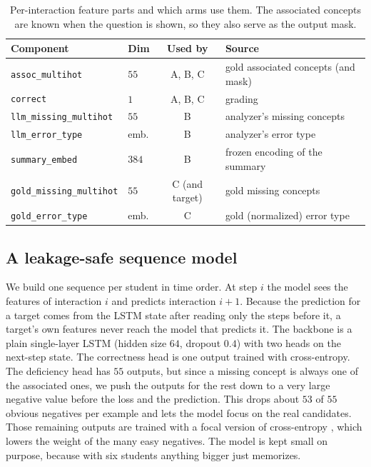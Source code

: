 \documentclass[11pt]{article}
\newcommand{\code}[1]{\texttt{\small #1}}
\begin{document}
\begin{table}[t]
\centering
\caption{Per-interaction feature parts and which arms use them. The associated
concepts are known when the question is shown, so they also serve as the output mask.}
\label{tab:features}
\small
\begin{tabular}{@{}llcl@{}}
\toprule
\textbf{Component} & \textbf{Dim} & \textbf{Used by} & \textbf{Source}\\
\midrule
\code{assoc\_multihot}        & $55$  & A, B, C & gold associated concepts (and mask)\\
\code{correct}                & $1$   & A, B, C & grading\\
\code{llm\_missing\_multihot} & $55$  & B       & analyzer's missing concepts\\
\code{llm\_error\_type}       & emb.  & B       & analyzer's error type\\
\code{summary\_embed}         & $384$ & B       & frozen encoding of the summary\\
\code{gold\_missing\_multihot}& $55$  & C (and target) & gold missing concepts\\
\code{gold\_error\_type}      & emb.  & C       & gold (normalized) error type\\
\bottomrule
\end{tabular}
\end{table}

\subsection{A leakage-safe sequence model}
We build one sequence per student in time order. At step $i$ the model sees the
features of interaction $i$ and predicts interaction $i\!+\!1$. Because the prediction
for a target comes from the LSTM state after reading only the steps before it, a
target's own features never reach the model that predicts it. The backbone is a plain
single-layer LSTM (hidden size $64$, dropout $0.4$) with two heads on the next-step
state. The correctness head is one output trained with cross-entropy. The deficiency
head has $55$ outputs, but since a missing concept is always one of the associated
ones, we push the outputs for the rest down to a very large negative value before the
loss and the prediction. This drops about $53$ of $55$ obvious negatives per example
and lets the model focus on the real candidates. Those remaining outputs are trained
with a focal version of cross-entropy \cite{lin2017focal}, which lowers the weight of
the many easy negatives. The model is kept small on purpose, because with six students
anything bigger just memorizes.
\end{document}
